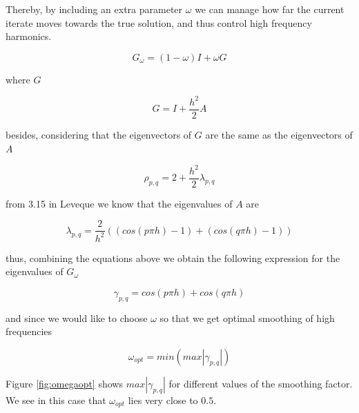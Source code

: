 \documentclass[main.tex]{subfiles}
\begin{document}
Thereby, by including an extra parameter $\omega$ we can manage how far the current iterate moves towards the true solution, and thus control high frequency harmonics.

\begin{equation}
G_\omega = (1-\omega)I + \omega G
\end{equation} 

where $G$

\begin{equation}
G = I + \frac{h^2}{2} A
\end{equation}

besides, considering that the eigenvectors of $G$ are the same as the eigenvectors of $A$

\begin{equation}
\rho_{p,q} = 2 + \frac{h^2}{2} \lambda_{p,q}
\end{equation}

from 3.15 in Leveque we know that the eigenvalues of $A$ are

\begin{equation}
\lambda_{p,q} = \frac{2}{h^2}((cos(p \pi h) -1) + (cos(q \pi h) -1 ))
\end{equation}

thus, combining the equations above we obtain the following expression for the eigenvalues of $G_\omega$

\begin{equation}
\gamma_{p,q} = cos(p \pi h) + cos(q \pi h)
\end{equation}

and since we would like to choose $\omega$ so that we get optimal smoothing of high frequencies

\begin{equation}
\omega_{opt} = min ( max |\gamma_{p,q}|)
\end{equation}

Figure \ref{fig:omegaopt} shows $max |\gamma_{p,q}|$ for different values of the smoothing factor. We see in this case that $\omega_{opt}$ lies very close to $0.5$.
\end{document}
